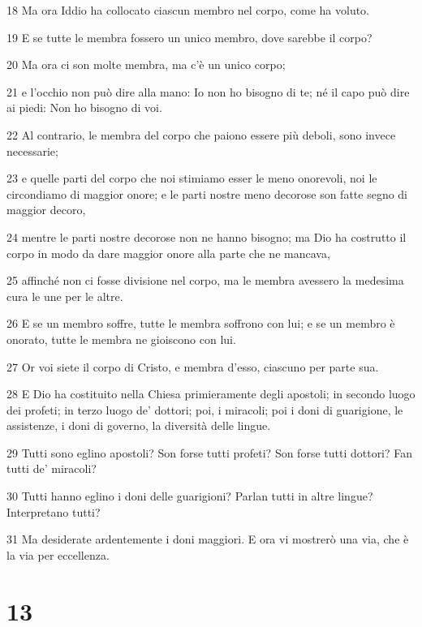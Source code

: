 \par 18 Ma ora Iddio ha collocato ciascun membro nel corpo, come ha voluto.
\par 19 E se tutte le membra fossero un unico membro, dove sarebbe il corpo?
\par 20 Ma ora ci son molte membra, ma c'è un unico corpo;
\par 21 e l'occhio non può dire alla mano: Io non ho bisogno di te; né il capo può dire ai piedi: Non ho bisogno di voi.
\par 22 Al contrario, le membra del corpo che paiono essere più deboli, sono invece necessarie;
\par 23 e quelle parti del corpo che noi stimiamo esser le meno onorevoli, noi le circondiamo di maggior onore; e le parti nostre meno decorose son fatte segno di maggior decoro,
\par 24 mentre le parti nostre decorose non ne hanno bisogno; ma Dio ha costrutto il corpo in modo da dare maggior onore alla parte che ne mancava,
\par 25 affinché non ci fosse divisione nel corpo, ma le membra avessero la medesima cura le une per le altre.
\par 26 E se un membro soffre, tutte le membra soffrono con lui; e se un membro è onorato, tutte le membra ne gioiscono con lui.
\par 27 Or voi siete il corpo di Cristo, e membra d'esso, ciascuno per parte sua.
\par 28 E Dio ha costituito nella Chiesa primieramente degli apostoli; in secondo luogo dei profeti; in terzo luogo de' dottori; poi, i miracoli; poi i doni di guarigione, le assistenze, i doni di governo, la diversità delle lingue.
\par 29 Tutti sono eglino apostoli? Son forse tutti profeti? Son forse tutti dottori? Fan tutti de' miracoli?
\par 30 Tutti hanno eglino i doni delle guarigioni? Parlan tutti in altre lingue? Interpretano tutti?
\par 31 Ma desiderate ardentemente i doni maggiori. E ora vi mostrerò una via, che è la via per eccellenza.

\chapter{13}

